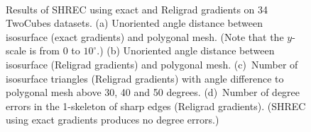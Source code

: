 \begin{figure}[tp]
\vspace{4em}
	\\

\caption{Results of SHREC using exact and Religrad gradients 
on 34 TwoCubes datasets. 
(a) Unoriented angle distance between isosurface (exact gradients)
and polygonal mesh.
(Note that the $y$-scale is from 0 to $10^\circ$.)
(b) Unoriented angle distance between isosurface (Religrad gradients)
and polygonal mesh.
(c)~Number of isosurface triangles (Religrad gradients)
with angle difference to polygonal mesh above 30, 40 and 50 degrees.
(d)~Number of degree errors in the 1-skeleton of sharp edges
(Religrad gradients).
(SHREC using exact gradients produces no degree errors.)}
\label{fig:shrecTwoCube}

\end{figure}


